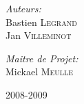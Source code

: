 \begin{titlepage}
		\vfill
		\begin{minipage}{0.5\textwidth}
			\begin{flushleft} \large
				\emph{Auteurs:}\\
				 Bastien \textsc{Legrand}\\
				 Jan \textsc{Villeminot}

			\end{flushleft}
		\end{minipage}
		\begin{minipage}{0.45\textwidth}
			\begin{flushright} \large
				\emph{Maitre de Projet:} \\
				Mickael \textsc{Meulle}\\
			\end{flushright}
		\end{minipage}
		
		\vfil
		\begin{center}
			{\large 2008-2009}
		\end{center}
	\end{titlepage}
